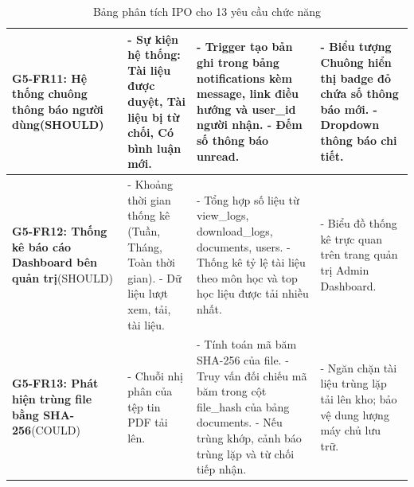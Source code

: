 \begin{table}[H]
\begin{tabularx}{\textwidth}{|p{3.6cm}|p{3.2cm}|X|p{3.2cm}|}
\hline
\textbf{G5-FR11: Hệ thống chuông thông báo người dùng}\newline(SHOULD) & 
- Sự kiện hệ thống: Tài liệu được duyệt, Tài liệu bị từ chối, Có bình luận mới. & 
- Trigger tạo bản ghi trong bảng notifications kèm message, link điều hướng và user\_id người nhận.\newline
- Đếm số thông báo unread. & 
- Biểu tượng Chuông hiển thị badge đỏ chứa số thông báo mới.\newline
- Dropdown thông báo chi tiết. \\
\hline
\textbf{G5-FR12: Thống kê báo cáo Dashboard bên quản trị}\newline(SHOULD) & 
- Khoảng thời gian thống kê (Tuần, Tháng, Toàn thời gian).\newline
- Dữ liệu lượt xem, tải, tài liệu. & 
- Tổng hợp số liệu từ view\_logs, download\_logs, documents, users.\newline
- Thống kê tỷ lệ tài liệu theo môn học và top học liệu được tải nhiều nhất. & 
- Biểu đồ thống kê trực quan trên trang quản trị Admin Dashboard. \\
\hline
\textbf{G5-FR13: Phát hiện trùng file bằng SHA-256}\newline(COULD) & 
- Chuỗi nhị phân của tệp tin PDF tải lên. & 
- Tính toán mã băm SHA-256 của file.\newline
- Truy vấn đối chiếu mã băm trong cột file\_hash của bảng documents.\newline
- Nếu trùng khớp, cảnh báo trùng lặp và từ chối tiếp nhận. & 
- Ngăn chặn tài liệu trùng lặp tải lên kho; bảo vệ dung lượng máy chủ lưu trữ. \\
\hline
\end{tabularx}
\caption{Bảng phân tích IPO cho 13 yêu cầu chức năng}
\label{tab:bang_ipo_13_chuc_nang}
\end{table}
